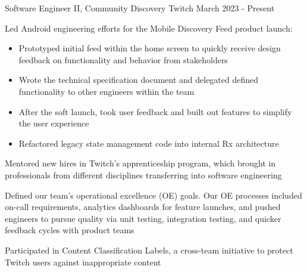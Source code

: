 

\begin{cventries}


  \cventry
    {Software Engineer II, Community Discovery} %
    {Twitch} %
    {} %
    {March 2023 - Present} %
    {
    \begin{cvitems} %
    \item { Led Android engineering efforts for the Mobile Discovery Feed product launch: 
        \begin{itemize}
            \item Prototyped initial feed within the home screen to quickly receive design feedback on functionality and behavior from stakeholders
            \item Wrote the technical specification document and delegated defined functionality to other engineers within the team
            \item After the soft launch, took user feedback and built out features to simplify the user experience
            \item Refactored legacy state management code into internal Rx architecture
        \end{itemize}}
    \item Mentored new hires in Twitch's apprenticeship program, which brought in professionals from different disciplines transferring into software engineering
    \item Defined our team's operational excellence (OE) goals. Our OE processes included on-call requirements, analytics dashboards for feature launches, and pushed engineers to pursue quality via unit testing, integration testing, and quicker feedback cycles with product teams
    \item Participated in Content Classification Labels, a cross-team initiative to protect Twitch users against inappropriate content
    \end{cvitems}
    }


\end{cventries}
